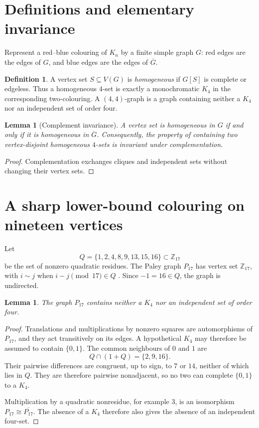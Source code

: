 \documentclass[11pt,a4paper]{article}
\newtheorem{lemma}[theorem]{Lemma}
\theoremstyle{definition}
\newtheorem{definition}[theorem]{Definition}
\theoremstyle{remark}
\begin{document}
\section{Definitions and elementary invariance}

Represent a red--blue colouring of \(K_n\) by a finite simple graph \(G\):
red edges are the edges of \(G\), and blue edges are the edges of
\(\overline G\).

\begin{definition}
A vertex set \(S\subseteq V(G)\) is \emph{homogeneous} if \(G[S]\) is
complete or edgeless.  Thus a homogeneous \(4\)-set is exactly a
monochromatic \(K_4\) in the corresponding two-colouring.  A
\((4,4)\)-graph is a graph containing neither a \(K_4\) nor an independent
set of order four.
\end{definition}

\begin{lemma}[Complement invariance]\label{lem:complement}
A vertex set is homogeneous in \(G\) if and only if it is homogeneous in
\(\overline G\).  Consequently, the property of containing two
vertex-disjoint homogeneous \(4\)-sets is invariant under complementation.
\end{lemma}

\begin{proof}
Complementation exchanges cliques and independent sets without changing
their vertex sets.
\end{proof}

\section{A sharp lower-bound colouring on nineteen vertices}

Let
\[
  Q=\{1,2,4,8,9,13,15,16\}\subset\mathbb Z_{17}
\]
be the set of nonzero quadratic residues.  The Paley graph \(P_{17}\) has
vertex set \(\mathbb Z_{17}\), with \(i\sim j\) when
\(i-j\pmod {17}\in Q\) \cite{paley}.  Since \(-1=16\in Q\), the graph is
undirected.

\begin{lemma}\label{lem:paley}
The graph \(P_{17}\) contains neither a \(K_4\) nor an independent set of
order four.
\end{lemma}

\begin{proof}
Translations and multiplications by nonzero squares are automorphisms of
\(P_{17}\), and they act transitively on its edges.  A hypothetical
\(K_4\) may therefore be assumed to contain \(\{0,1\}\).  The common
neighbours of \(0\) and \(1\) are
\[
  Q\cap(1+Q)=\{2,9,16\}.
\]
Their pairwise differences are congruent, up to sign, to \(7\) or \(14\),
neither of which lies in \(Q\).  They are therefore pairwise nonadjacent,
so no two can complete \(\{0,1\}\) to a \(K_4\).

Multiplication by a quadratic nonresidue, for example \(3\), is an
isomorphism \(P_{17}\cong\overline{P_{17}}\).  The absence of a \(K_4\)
therefore also gives the absence of an independent four-set.
\end{proof}
\end{document}
